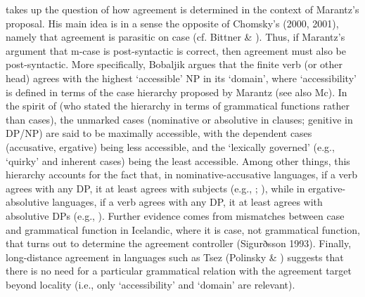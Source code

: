 \documentclass[output=paper]{langsci/langscibook}
\begin{document}
\citet{Bobaljik2008} takes up the question of how agreement is determined in the context of Marantz’s proposal. His main idea is in a sense the opposite of Chomsky’s (2000, 2001), namely that agreement is parasitic on case (cf. Bittner \& \citealt{Hale1996}). Thus, if Marantz’s argument that m-case is post-syntactic is correct, then agreement must also be post-syntactic. More specifically, Bobaljik argues that the finite verb (or other head) agrees with the highest ‘accessible’ NP in its ‘domain’, where ‘accessibility’ is defined in terms of the case hierarchy proposed by Marantz (see also Mc\citealt{Fadden2004}). In the spirit of \citet{Moravcsik1974} (who stated the hierarchy in terms of grammatical functions rather than cases), the unmarked cases (nominative or absolutive in clauses; genitive in DP/NP) are said to be maximally accessible, with the dependent cases (accusative, ergative) being less accessible, and the ‘lexically governed’ (e.g., ‘quirky’ and inherent cases) being the least accessible. Among other things, this hierarchy accounts for the fact that, in nominative-accusative languages, if a verb agrees with any DP, it at least agrees with subjects (e.g., \citealt{Moravcsik1974}; \citealt{Gilligan1987}), while in ergative-absolutive languages, if a verb agrees with any DP, it at least agrees with absolutive DPs (e.g., \citealt{Croft1990}). Further evidence comes from mismatches between case and grammatical function in Icelandic, where it is case, not grammatical function, that turns out to determine the agreement controller (Sigurðsson 1993). Finally, long-distance agreement in languages such as Tsez (Polinsky \& \citealt{Potsdam2001}) suggests that there is no need for a particular grammatical relation with the agreement target beyond locality (i.e., only ‘accessibility’ and ‘domain’ are relevant).
\end{document}

